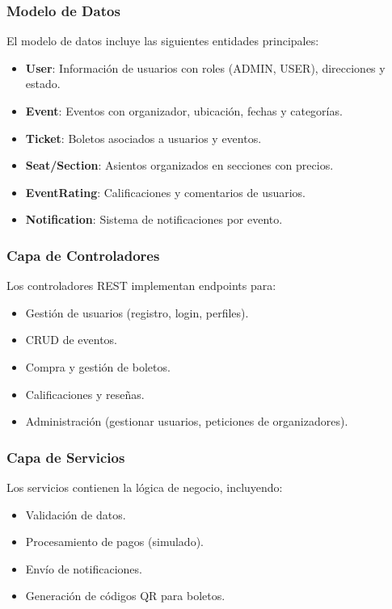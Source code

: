 \subsubsection{Modelo de Datos}
El modelo de datos incluye las siguientes entidades principales:
\begin{itemize}
\item \textbf{User}: Información de usuarios con roles (ADMIN, USER), direcciones y estado.
\item \textbf{Event}: Eventos con organizador, ubicación, fechas y categorías.
\item \textbf{Ticket}: Boletos asociados a usuarios y eventos.
\item \textbf{Seat/Section}: Asientos organizados en secciones con precios.
\item \textbf{EventRating}: Calificaciones y comentarios de usuarios.
\item \textbf{Notification}: Sistema de notificaciones por evento.
\end{itemize}

\subsubsection{Capa de Controladores}
Los controladores REST implementan endpoints para:
\begin{itemize}
\item Gestión de usuarios (registro, login, perfiles).
\item CRUD de eventos.
\item Compra y gestión de boletos.
\item Calificaciones y reseñas.
\item Administración (gestionar usuarios, peticiones de organizadores).
\end{itemize}

\subsubsection{Capa de Servicios}
Los servicios contienen la lógica de negocio, incluyendo:
\begin{itemize}
\item Validación de datos.
\item Procesamiento de pagos (simulado).
\item Envío de notificaciones.
\item Generación de códigos QR para boletos.
\end{itemize}

